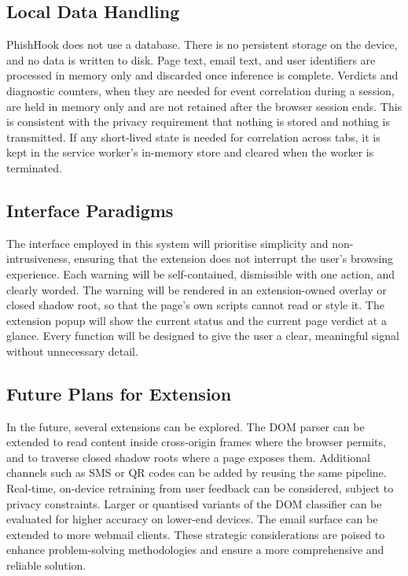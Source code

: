 \documentclass{FastFyp}
\begin{document}
\subsection{Local Data Handling}
PhishHook does not use a database. There is no persistent storage on the device, and no data is written to disk. Page text, email text, and user identifiers are processed in memory only and discarded once inference is complete. Verdicts and diagnostic counters, when they are needed for event correlation during a session, are held in memory only and are not retained after the browser session ends. This is consistent with the privacy requirement that nothing is stored and nothing is transmitted. If any short-lived state is needed for correlation across tabs, it is kept in the service worker's in-memory store and cleared when the worker is terminated.

\subsection{Interface Paradigms}
The interface employed in this system will prioritise simplicity and non-intrusiveness, ensuring that the extension does not interrupt the user's browsing experience. Each warning will be self-contained, dismissible with one action, and clearly worded. The warning will be rendered in an extension-owned overlay or closed shadow root, so that the page's own scripts cannot read or style it. The extension popup will show the current status and the current page verdict at a glance. Every function will be designed to give the user a clear, meaningful signal without unnecessary detail.

\subsection{Future Plans for Extension}
In the future, several extensions can be explored. The DOM parser can be extended to read content inside cross-origin frames where the browser permits, and to traverse closed shadow roots where a page exposes them. Additional channels such as SMS or QR codes can be added by reusing the same pipeline. Real-time, on-device retraining from user feedback can be considered, subject to privacy constraints. Larger or quantised variants of the DOM classifier can be evaluated for higher accuracy on lower-end devices. The email surface can be extended to more webmail clients. These strategic considerations are poised to enhance problem-solving methodologies and ensure a more comprehensive and reliable solution.
\end{document}
